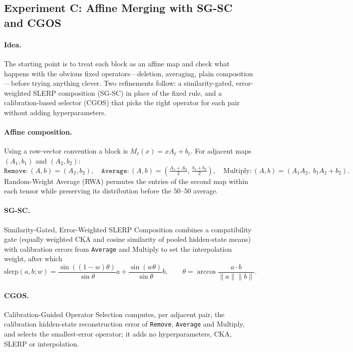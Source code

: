 \documentclass[10pt,a4paper]{article}
\newcommand{\removeop}{\texttt{Remove}}
\newcommand{\averageop}{\texttt{Average}}
\newcommand{\slerp}{\mathrm{slerp}}
\begin{document}
\subsection{Experiment C: Affine Merging with SG-SC and CGOS}
\label{sec:expC}

\paragraph{Idea.} The starting point is to treat each block as an affine map and
check what happens with the obvious fixed operators---deletion, averaging,
plain composition---before trying anything clever. Two refinements follow: a
similarity-gated, error-weighted SLERP composition (SG-SC) in place of the
fixed rule, and a calibration-based selector (CGOS) that picks the right
operator for each pair without adding hyperparameters.

\paragraph{Affine composition.} Using a row-vector convention a block is
$M_\ell(x)=x A_\ell + b_\ell$. For adjacent maps $(A_1,b_1)$ and $(A_2,b_2)$:
\begin{equation}
\removeop: (A,b)=(A_2,b_2),\quad
\averageop: (A,b)=\left(\tfrac{A_1+A_2}{2},\,\tfrac{b_1+b_2}{2}\right),\quad
\text{Multiply}: (A,b)=(A_1A_2,\; b_1A_2 + b_2).
\end{equation}
Random-Weight Average (RWA) permutes the entries of the second map within each
tensor while preserving its distribution before the $50$--$50$ average.

\paragraph{SG-SC.} Similarity-Gated, Error-Weighted SLERP Composition combines a
compatibility gate (equally weighted CKA and cosine similarity of pooled
hidden-state means) with calibration errors from \averageop{} and Multiply to set
the interpolation weight, after which
\begin{equation}
\slerp(a,b;w)=\frac{\sin((1-w)\theta)}{\sin\theta}a+\frac{\sin(w\theta)}{\sin\theta}b,
\qquad \theta=\arccos\!\frac{a\cdot b}{\lVert a\rVert\lVert b\rVert}.
\end{equation}

\paragraph{CGOS.} Calibration-Guided Operator Selection computes, per adjacent
pair, the calibration hidden-state reconstruction error of \removeop{},
\averageop{} and Multiply, and selects the smallest-error operator; it adds no
hyperparameters, CKA, SLERP or interpolation.
\end{document}
